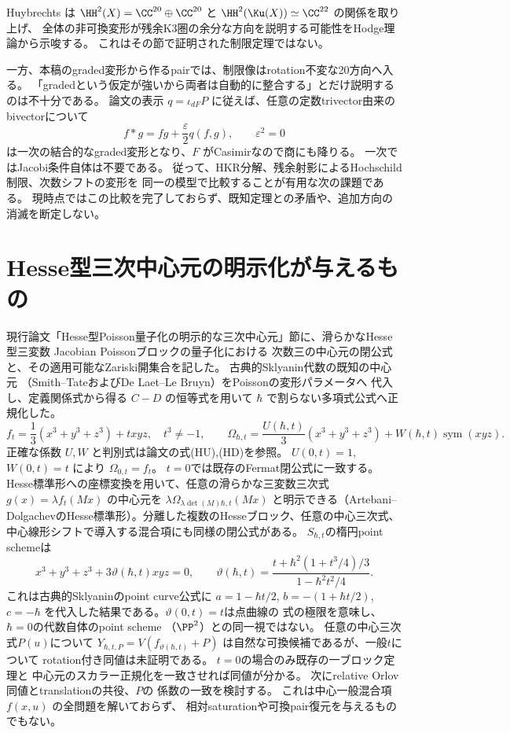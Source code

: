 Huybrechts \cite[Section 9]{HuyUpdate} は
\(\HH^2(X)=\CC^{20}\oplus\CC^{20}\) と
\(\HH^2(\Ku(X))\simeq\CC^{22}\) の関係を取り上げ、
全体の非可換変形が残余K3圏の余分な方向を説明する可能性をHodge理論から示唆する。
これはその節で証明された制限定理ではない。

一方、本稿のgraded変形から作るpairでは、制限像はrotation不変な20方向へ入る。
「gradedという仮定が強いから両者は自動的に整合する」とだけ説明するのは不十分である。
論文の表示 \(q=\iota_{dF}P\) に従えば、任意の定数trivector由来のbivectorについて
\[
 f*g=fg+\frac\varepsilon2q(f,g),\qquad\varepsilon^2=0
\]
は一次の結合的なgraded変形となり、\(F\) がCasimirなので商にも降りる。
一次ではJacobi条件自体は不要である。
従って、HKR分解、残余射影によるHochschild制限、次数シフトの変形を
同一の模型で比較することが有用な次の課題である。
現時点ではこの比較を完了しておらず、既知定理との矛盾や、追加方向の消滅を断定しない。

\section{Hesse型三次中心元の明示化が与えるもの}
\label{sec:notes-hesse-explicit}
現行論文「Hesse型Poisson量子化の明示的な三次中心元」節に、滑らかなHesse型三変数
Jacobian Poissonブロックの量子化における
次数三の中心元の閉公式と、その適用可能なZariski開集合を記した。
古典的Sklyanin代数の既知の中心元
（Smith--TateおよびDe Laet--Le Bruyn）をPoissonの変形パラメータへ
代入し、定義関係式から得る $C-D$ の恒等式を用いて
$\hbar$ で割らない多項式公式へ正規化した。
\[
 f_t=\frac13(x^3+y^3+z^3)+txyz,\quad t^3\ne-1,\qquad
 \Omega_{\hbar,t}=
 \frac{U(\hbar,t)}3(x^3+y^3+z^3)
 +W(\hbar,t)\operatorname{sym}(xyz).
\]
正確な係数 $U,W$ と判別式は論文の式(HU),(HD)を参照。
$U(0,t)=1$, $W(0,t)=t$ により $\Omega_{0,t}=f_t$。
$t=0$では既存のFermat閉公式に一致する。
Hesse標準形への座標変換を用いて、任意の滑らかな三変数三次式 $g(x)=\lambda f_t(Mx)$ の中心元を $\lambda\Omega_{\lambda\det(M)\hbar,t}(Mx)$ と明示できる（Artebani--DolgachevのHesse標準形）。分離した複数のHesseブロック、任意の中心三次式、
中心線形シフトで導入する混合項にも同様の閉公式がある。
$S_{\hbar,t}$の楕円point schemeは
\[
 x^3+y^3+z^3+3\vartheta(\hbar,t)xyz=0,\qquad
 \vartheta(\hbar,t)=
 \frac{t+\hbar^2(1+t^3/4)/3}{1-\hbar^2t^2/4}.
\]
これは古典的Sklyaninのpoint curve公式に
$a=1-\hbar t/2$, $b=-(1+\hbar t/2)$, $c=-\hbar$
を代入した結果である。$\vartheta(0,t)=t$は点曲線の
式の極限を意味し、$\hbar=0$の代数自体のpoint scheme
（$\PP^2$）との同一視ではない。
任意の中心三次式$P(u)$について
$Y_{\hbar,t,P}=V(f_{\vartheta(\hbar,t)}+P)$
は自然な可換候補であるが、一般$t$について
rotation付き同値は未証明である。
$t=0$の場合のみ既存の一ブロック定理と
中心元のスカラー正規化を一致させれば同値が分かる。
次にrelative Orlov同値とtranslationの共役、$P$の
係数の一致を検討する。
これは中心一般混合項 $f(x,u)$ の全問題を解いておらず、
相対saturationや可換pair復元を与えるものでもない。

